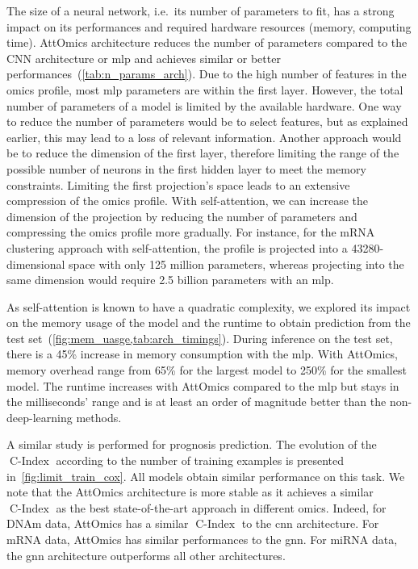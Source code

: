 \documentclass[../main.tex]{subfiles}
\begin{document}
		The size of a neural network, i.e.\ its number of parameters to fit, has a strong impact on its performances and required hardware resources (memory, computing time).
		AttOmics architecture reduces the number of parameters compared to the CNN architecture or \gls{mlp} and achieves similar or better performances~(\cref{tab:n_params_arch}).
		Due to the high number of features in the omics profile, most \gls{mlp} parameters are within the first layer.
		However, the total number of parameters of a model is limited by the available hardware.
		One way to reduce the number of parameters would be to select features, but as explained earlier, this may lead to a loss of relevant information.
		Another approach would be to reduce the dimension of the first layer, therefore limiting the range of the possible number of neurons in the first hidden layer to meet the memory constraints.
		Limiting the first projection's space leads to an extensive compression of the omics profile.
		With self-attention, we can increase the dimension of the projection by reducing the number of parameters and compressing the omics profile more gradually.
		For instance, for the mRNA clustering approach with self-attention, the profile is projected into a 43280-dimensional space with only 125 million parameters, whereas projecting into the same dimension would require 2.5 billion parameters with an \gls{mlp}.

		As self-attention is known to have a quadratic complexity, we explored its impact on the memory usage of the model and the runtime to obtain prediction from the test set~(\cref{fig:mem_uasge,tab:arch_timings}).
		During inference on the test set, there is a 45\% increase in memory consumption with the \gls{mlp}.
		With AttOmics, memory overhead range from 65\% for the largest model to 250\% for the smallest model.
		The runtime increases with AttOmics compared to the \gls{mlp} but stays in the milliseconds' range and is at least an order of magnitude better than the non-deep-learning methods.


		A similar study is performed for prognosis prediction.
		The evolution of the \(\operatorname{C-Index}\) according to the number of training examples is presented in~\cref{fig:limit_train_cox}.
		All models obtain similar performance on this task.
		We note that the AttOmics architecture is more stable as it achieves a similar \(\operatorname{C-Index}\) as the best state-of-the-art approach in different omics.
		Indeed, for DNAm data, AttOmics has a similar \(\operatorname{C-Index}\) to the \gls{cnn} architecture. For mRNA data, AttOmics has similar performances to the \gls{gnn}.
		For miRNA data, the \gls{gnn} architecture outperforms all other architectures.
\end{document}
